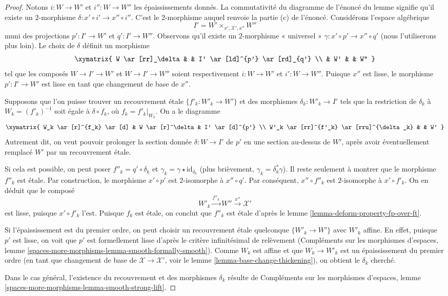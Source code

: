 \begin{proof}
Notons $i : W \to W'$ et $i'' : W \to W''$ les épaississements donnés.
La commutativité du diagramme de l'énoncé du lemme
signifie qu'il existe un $2$-morphisme $\delta : x' \circ i' \to x'' \circ i''$.
C'est le $2$-morphisme auquel renvoie la partie (c) de l'énoncé.
Considérons l'espace algébrique
$$
I' = W' \times_{x', \mathcal{X}', x''} W''
$$
muni des projections $p' : I' \to W'$ et $q' : I' \to W''$.
Observons qu'il existe un $2$-morphisme « universel »
$\gamma : x' \circ p' \to x'' \circ q'$ (nous l'utiliserons plus loin).
Le choix de $\delta$ définit un morphisme
$$
\xymatrix{
W \ar[rr]_\delta & & I' \ar[ld]^{p'} \ar[rd]_{q'} \\
& W' & & W''
}
$$
tel que les composés $W \to I' \to W'$ et $W \to I' \to W''$
soient respectivement $i : W \to W'$ et $i' : W \to W''$.
Puisque $x''$ est lisse, le morphisme $p' : I' \to W'$ est lisse
en tant que changement de base de $x''$.

\medskip\noindent
Supposons que l'on puisse trouver un recouvrement \'etale $\{f'_k : W'_k \to W'\}$
et des morphismes $\delta_k : W'_k \to I'$ tels que la restriction
de $\delta_k$ à $W_k = (f'_k)^{-1}$ soit égale à $\delta \circ f_k$,
où $f_k = f'_k|_{W_k}$. On a le diagramme
$$
\xymatrix{
W_k \ar[r]^{f_k} \ar[d] & W \ar[r]^\delta & I' \ar[d]^{p'} \\
W'_k \ar[rr]^{f'_k} \ar[rru]^{\delta_k} & & W'
}
$$
Autrement dit, on veut pouvoir prolonger la section donnée
$\delta : W \to I'$ de $p'$ en une section au-dessus de $W'$, après avoir éventuellement
remplacé $W'$ par un recouvrement \'etale.

\medskip\noindent
Si cela est possible, on peut poser $f''_k = q' \circ \delta_k$
et $\gamma_k = \gamma \star \text{id}_{\delta_k}$ (plus brièvement,
$\gamma_k = \delta_k^*\gamma$). Il reste seulement à montrer
que le morphisme $f''_k$ est \'etale.
Par construction, le morphisme $x' \circ p'$ est $2$-isomorphe
à $x'' \circ q'$. Par conséquent, $x'' \circ f''_k$ est $2$-isomorphe
à $x' \circ f'_k$. On en déduit que le composé
$$
W'_k \xrightarrow{f''_k} W'' \xrightarrow{x''} \mathcal{X}'
$$
est lisse, puisque $x' \circ f'_k$ l'est.
Puisque $f_k$ est \'etale, on conclut que $f''_k$ est \'etale
d'après le lemme \ref{lemma-deform-property-fp-over-ft}.

\medskip\noindent
Si l'épaississement est du premier ordre, on peut
choisir un recouvrement \'etale quelconque $\{W'_k \to W'\}$ avec $W'_k$ affine.
En effet, puisque $p'$ est lisse, on voit que $p'$ est formellement lisse d'après le
critère infinitésimal de relèvement (Compléments sur les morphismes d'espaces, lemme
\ref{spaces-more-morphisms-lemma-smooth-formally-smooth}).
Comme $W_k$ est affine et que $W_k \to W'_k$ est un épaississement du premier ordre
(en tant que changement de base de $\mathcal{X} \to \mathcal{X}'$, voir
le lemme \ref{lemma-base-change-thickening}), on obtient le $\delta_k$
cherché.

\medskip\noindent
Dans le cas général, l'existence du recouvrement et des morphismes
$\delta_k$ résulte de Compléments sur les morphismes d'espaces, lemme
\ref{spaces-more-morphisms-lemma-smooth-strong-lift}.
\end{proof}

